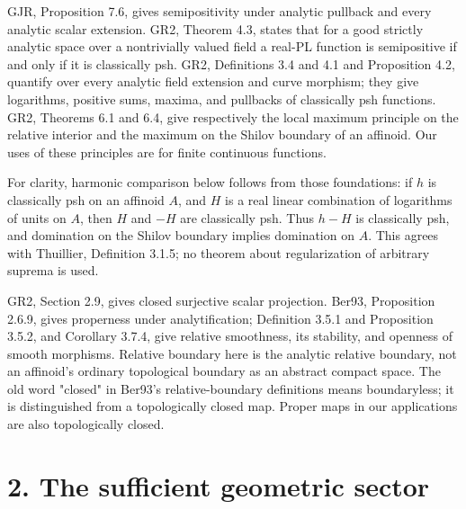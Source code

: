 \documentclass[11pt]{article}
\begin{document}
GJR, Proposition 7.6, gives semipositivity under analytic pullback and every analytic scalar extension. GR2, Theorem 4.3, states that for a good strictly analytic space over a nontrivially valued field a real-PL function is semipositive if and only if it is classically psh. GR2, Definitions 3.4 and 4.1 and Proposition 4.2, quantify over every analytic field extension and curve morphism; they give logarithms, positive sums, maxima, and pullbacks of classically psh functions. GR2, Theorems 6.1 and 6.4, give respectively the local maximum principle on the relative interior and the maximum on the Shilov boundary of an affinoid. Our uses of these principles are for finite continuous functions.

For clarity, harmonic comparison below follows from those foundations: if \(h\) is classically psh on an affinoid \(A\), and \(H\) is a real linear combination of logarithms of units on \(A\), then \(H\) and \(-H\) are classically psh. Thus \(h-H\) is classically psh, and domination on the Shilov boundary implies domination on \(A\). This agrees with Thuillier, Definition 3.1.5; no theorem about regularization of arbitrary suprema is used.

GR2, Section 2.9, gives closed surjective scalar projection. Ber93, Proposition 2.6.9, gives properness under analytification; Definition 3.5.1 and Proposition 3.5.2, and Corollary 3.7.4, give relative smoothness, its stability, and openness of smooth morphisms. Relative boundary here is the analytic relative boundary, not an affinoid's ordinary topological boundary as an abstract compact space. The old word "closed" in Ber93's relative-boundary definitions means boundaryless; it is distinguished from a topologically closed map. Proper maps in our applications are also topologically closed.

\section*{2. The sufficient geometric sector}
\end{document}
